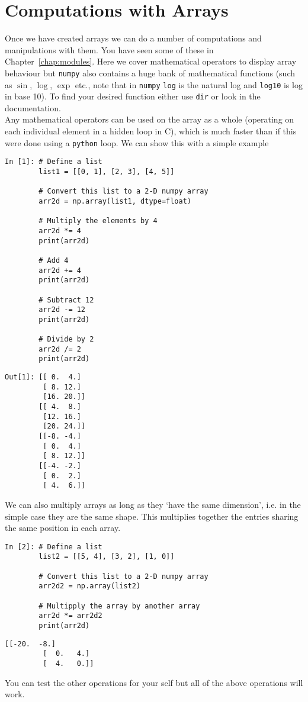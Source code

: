 \section{Computations with Arrays}

Once we have created arrays we can do a number of computations and manipulations with them. You have seen some of these in Chapter~\ref{chap:modules}. Here we cover mathematical operators to display array behaviour but \texttt{numpy} also contains a huge bank of mathematical functions (such as $\sin$, $\log$, $\exp$ etc., note that in \texttt{numpy} \texttt{log} is the natural log and \texttt{log10} is log in base 10). To find your desired function either use \texttt{dir} or look in the documentation.\\

Any mathematical operators can be used on the array as a whole (operating on each individual element in a hidden loop in C), which is much faster than if this were done using a \texttt{python} loop. We can show this with a simple example

\begin{lstlisting}[style=PY]
In [1]: # Define a list
        list1 = [[0, 1], [2, 3], [4, 5]]
        
        # Convert this list to a 2-D numpy array
        arr2d = np.array(list1, dtype=float)
        
        # Multiply the elements by 4
        arr2d *= 4
        print(arr2d)
        
        # Add 4
        arr2d += 4
        print(arr2d)
        
        # Subtract 12
        arr2d -= 12
        print(arr2d)
        
        # Divide by 2
        arr2d /= 2
        print(arr2d)
\end{lstlisting}
\begin{lstlisting}[style=PY, backgroundcolor=\color{white}]
Out[1]: [[ 0.  4.]
         [ 8. 12.]
         [16. 20.]]
        [[ 4.  8.]
         [12. 16.]
         [20. 24.]]
        [[-8. -4.]
         [ 0.  4.]
         [ 8. 12.]]
        [[-4. -2.]
         [ 0.  2.]
         [ 4.  6.]]
\end{lstlisting}

\newpage

We can also multiply arrays as long as they `have the same dimension', i.e. in the simple case they are the same shape. This multiplies together the entries sharing the same position in each array.
\begin{lstlisting}[style=PY]
In [2]: # Define a list
        list2 = [[5, 4], [3, 2], [1, 0]]
        
        # Convert this list to a 2-D numpy array
        arr2d2 = np.array(list2)
        
        # Multipply the array by another array
        arr2d *= arr2d2
        print(arr2d)
\end{lstlisting}
\begin{lstlisting}[style=PY, backgroundcolor=\color{white}]
        [[-20.  -8.]
         [  0.   4.]
         [  4.   0.]]
\end{lstlisting}
You can test the other operations for your self but all of the above operations will work. 

